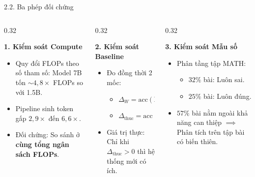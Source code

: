 \documentclass[aspectratio=169,10pt]{beamer}
\newcommand{\dhonest}{\Delta_{\mathrm{thuc}}}
\newcommand{\acc}{\mathrm{acc}}
\begin{document}
\begin{frame}{2.2. Ba phép đối chứng}
  \begin{columns}[t]
    \begin{column}{0.32\textwidth}
      \begin{block}{\textbf{1. Kiểm soát Compute}}
        \begin{itemize}\footnotesize
          \item Quy đổi FLOPs theo số tham số: Model 7B tốn $\sim 4{,}8\times$ FLOPs so với 1.5B.
          \item Pipeline sinh token gấp $2{,}9\times$ đến $6{,}6\times$.
          \item Đối chứng: So sánh ở \textbf{cùng tổng ngân sách FLOPs}.
        \end{itemize}
      \end{block}
    \end{column}
    
    \begin{column}{0.32\textwidth}
      \begin{block}{\textbf{2. Kiểm soát Baseline}}
        \begin{itemize}\footnotesize
          \item Đo đồng thời 2 mốc:
            \begin{itemize}\scriptsize
              \item $\Delta_W = \acc(\text{Hệ}) - \acc(W)$
              \item $\dhonest = \acc(\text{Hệ}) - \acc(I)$
            \end{itemize}
          \item Giá trị thực: Chỉ khi $\dhonest > 0$ thì hệ thống mới có ích.
        \end{itemize}
      \end{block}
    \end{column}
    
    \begin{column}{0.32\textwidth}
      \begin{block}{\textbf{3. Kiểm soát Mẫu số}}
        \begin{itemize}\footnotesize
          \item Phân tầng tập MATH:
            \begin{itemize}\scriptsize
              \item $32\%$ bài: Luôn sai.
              \item $25\%$ bài: Luôn đúng.
            \end{itemize}
          \item $57\%$ bài nằm ngoài khả năng can thiệp $\implies$ Phân tích trên tập bài có biến thiên.
        \end{itemize}
      \end{block}
    \end{column}
  \end{columns}
\end{frame}
\end{document}
